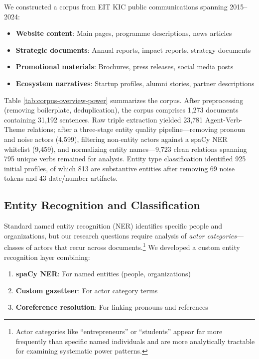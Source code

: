 \documentclass[../main.tex]{subfiles}
\begin{document}
We constructed a corpus from EIT KIC public communications spanning 2015--2024:
\begin{itemize}
    \item \textbf{Website content}: Main pages, programme descriptions, news articles
    \item \textbf{Strategic documents}: Annual reports, impact reports, strategy documents
    \item \textbf{Promotional materials}: Brochures, press releases, social media posts
    \item \textbf{Ecosystem narratives}: Startup profiles, alumni stories, partner descriptions
\end{itemize}

Table \ref{tab:corpus-overview-power} summarizes the corpus. After preprocessing (removing boilerplate, deduplication), the corpus comprises 1,273 documents containing 31,192 sentences. Raw triple extraction yielded 23,781 Agent-Verb-Theme relations; after a three-stage entity quality pipeline---removing pronoun and noise actors (4,599), filtering non-entity actors against a spaCy NER whitelist (9,459), and normalizing entity names---9,723 clean relations spanning 795 unique verbs remained for analysis. Entity type classification identified 925 initial profiles, of which 813 are substantive entities after removing 69 noise tokens and 43 date/number artifacts.

\subsection{Entity Recognition and Classification}

Standard named entity recognition (NER) identifies specific people and organizations, but our research questions require analysis of \textit{actor categories}---classes of actors that recur across documents.\footnote{Actor categories like ``entrepreneurs'' or ``students'' appear far more frequently than specific named individuals and are more analytically tractable for examining systematic power patterns.} We developed a custom entity recognition layer combining:

\begin{enumerate}
    \item \textbf{spaCy NER}: For named entities (people, organizations)
    \item \textbf{Custom gazetteer}: For actor category terms
    \item \textbf{Coreference resolution}: For linking pronouns and references
\end{enumerate}
\end{document}
